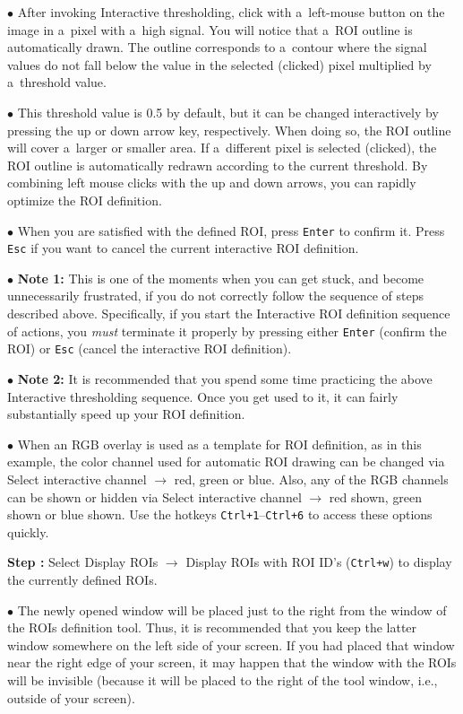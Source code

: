 \documentclass[a4paper, 11pt]{article}
\newcommand{\ttt}[1]{\texttt{#1}}
\newcommand{\lans}[1]{{\color{magenta}#1}}
\newcommand\ra{\rightarrow}
\newcounter{step}
\newcommand\s{\addtocounter{step}{1}\noindent\textbf{Step \thestep:}{ }}
\newcommand\bul{\noindent$\bullet${ }}
\newcommand\bb[1]{\textbf{#1}}
\begin{document}
\bul After invoking \lans{Interactive thresholding}, click with a~left-mouse button on the image in a~pixel with a~high signal. You will notice that a~ROI outline is automatically drawn. The outline corresponds to a~contour where the signal values do not fall below the value in the selected (clicked) pixel multiplied by a~threshold value.

\bul This threshold value is 0.5 by default, but it can be changed interactively by pressing the \lans{up} or \lans{down} arrow key, respectively. When doing so, the ROI outline will cover a~larger or smaller area. If a~different pixel is selected (clicked), the ROI outline is automatically redrawn according to the current threshold. By combining left mouse clicks with the \lans{up} and \lans{down} arrows, you can rapidly optimize the ROI definition.

\bul When you are satisfied with the defined ROI, press \ttt{Enter} to confirm it. Press \ttt{Esc} if you want to cancel the current interactive ROI definition.

\bul \bb{Note 1:} This is one of the moments when you can get stuck, and become unnecessarily frustrated, if you do not correctly follow the sequence of steps described above. Specifically, if you start the \lans{Interactive ROI definition} sequence of actions, you \emph{must} terminate it properly by pressing either \ttt{Enter} (confirm the ROI) or \ttt{Esc} (cancel the interactive ROI definition). 

\bul \bb{Note 2:} It is recommended that you spend some time practicing the above Interactive thresholding sequence. Once you get used to it, it can fairly substantially speed up your ROI definition.

\bul When an RGB overlay is used as a template for ROI definition, as in this example, the color channel used for automatic ROI drawing can be changed via \lans{Select interactive channel} $\ra$ \lans{red}, \lans{green} or \lans{blue}. Also, any of the RGB channels can be shown or hidden via \lans{Select interactive channel} $\ra$ \lans{red  shown}, \lans{green shown} or \lans{blue shown}. Use the hotkeys \ttt{Ctrl+1}--\ttt{Ctrl+6} to access these options quickly.

\s Select \lans{Display ROIs} $\ra$ \lans{Display ROIs with ROI ID's} (\ttt{Ctrl+w}) to display the currently defined ROIs.

\bul The newly opened window will be placed just to the right from the window of the ROIs definition tool. Thus, it is recommended that you keep the latter window somewhere on the left side of your screen. If you had placed that window near the right edge of your screen, it may happen that the window with the ROIs will be invisible (because it will be placed to the right of the tool window, i.e., outside of your screen).
\end{document}
